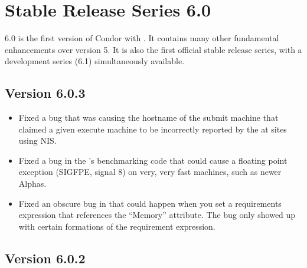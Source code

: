 \section{\label{sec:History-6-0}Stable Release Series 6.0}

6.0 is the first version of Condor with .
It contains many other fundamental enhancements over version 5.
It is also the first official stable release series, with a
development series (6.1) simultaneously available.


\subsection{\label{sec:New-6-0-3}Version 6.0.3}

\begin{itemize}

\item Fixed a bug that was causing the hostname of the submit machine
that claimed a given execute machine to be incorrectly reported by the
 at sites using NIS.

\item Fixed a bug in the 's benchmarking code that
could cause a floating point exception (SIGFPE, signal 8) on very,
very fast machines, such as newer Alphas.

\item Fixed an obscure bug in  that could happen when
you set a requirements expression that references the ``Memory''
attribute.
The bug only showed up with certain formations of the requirement
expression.

\end{itemize}


\subsection{\label{sec:New-6-0-2}Version 6.0.2}

